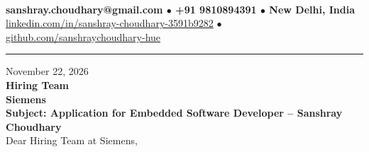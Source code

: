 \documentclass[10pt,a4paper]{article}%
\begin{document}
%
 \vspace{3pt}\\%
\noindent \textbf{\footnotesize sanshray.choudhary@gmail.com $\bullet$ +91 9810894391 $\bullet$ New Delhi, India}\\%
\noindent \href{https://www.linkedin.com/in/sanshray-choudhary-3591b9282}{linkedin.com/in/sanshray-choudhary-3591b9282} $\bullet$ \href{https://github.com/sanshraychoudhary-hue}{github.com/sanshraychoudhary-hue} \vspace{12pt}%
\hrule \vspace{18pt}%

\noindent November 22, 2026 \vspace{12pt}\\%
\noindent \textbf{Hiring Team} \\%
\noindent \textbf{Siemens} \vspace{16pt}\\%

\noindent \textbf{Subject: Application for Embedded Software Developer -- Sanshray Choudhary} \vspace{12pt}\\%

\noindent Dear Hiring Team at Siemens, \vspace{8pt}\\%
\end{document}
